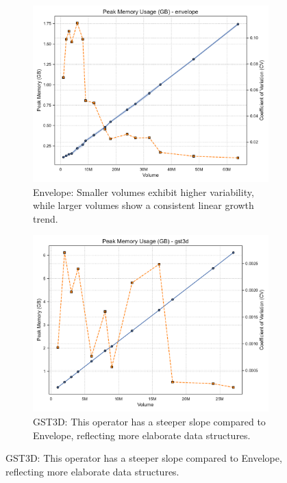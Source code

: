 \begin{figure}[htbp]
    \centering
    \begin{subfigure}[t]{0.49\textwidth}
        \centering
        \includegraphics[width=\textwidth]{assets/images/05/peak_memory_by_volume_envelope}
        \caption{Envelope: Smaller volumes exhibit higher variability, while larger volumes show a consistent linear growth trend.}
    \end{subfigure}
    \hfill
    \begin{subfigure}[t]{0.49\textwidth}
        \centering
        \includegraphics[width=\textwidth]{assets/images/05/peak_memory_by_volume_gst3d}
        \caption{\ac{GST3D}: This operator has a steeper slope compared to Envelope, reflecting more elaborate data structures.}

\end{subfigure}
\end{figure}
